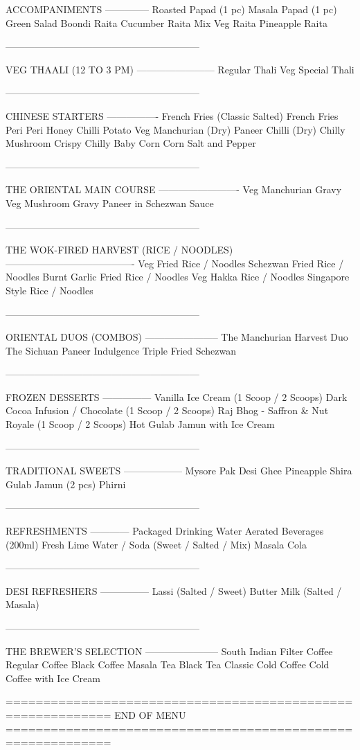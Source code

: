 ACCOMPANIMENTS
--------------
Roasted Papad (1 pc)
Masala Papad (1 pc)
Green Salad
Boondi Raita
Cucumber Raita
Mix Veg Raita
Pineapple Raita

------------------------------------------------------------

VEG THAALI (12 TO 3 PM)
------------------------
Regular Thali Veg
Special Thali

------------------------------------------------------------

CHINESE STARTERS
----------------
French Fries (Classic Salted)
French Fries Peri Peri
Honey Chilli Potato
Veg Manchurian (Dry)
Paneer Chilli (Dry)
Chilly Mushroom
Crispy Chilly Baby Corn
Corn Salt and Pepper

------------------------------------------------------------

THE ORIENTAL MAIN COURSE
-------------------------
Veg Manchurian Gravy
Veg Mushroom Gravy
Paneer in Schezwan Sauce

------------------------------------------------------------

THE WOK-FIRED HARVEST (RICE / NOODLES)
----------------------------------------
Veg Fried Rice / Noodles
Schezwan Fried Rice / Noodles
Burnt Garlic Fried Rice / Noodles
Veg Hakka Rice / Noodles
Singapore Style Rice / Noodles

------------------------------------------------------------

ORIENTAL DUOS (COMBOS)
-----------------------
The Manchurian Harvest Duo
The Sichuan Paneer Indulgence
Triple Fried Schezwan

------------------------------------------------------------

FROZEN DESSERTS
---------------
Vanilla Ice Cream (1 Scoop / 2 Scoops)
Dark Cocoa Infusion / Chocolate (1 Scoop / 2 Scoops)
Raj Bhog - Saffron & Nut Royale (1 Scoop / 2 Scoops)
Hot Gulab Jamun with Ice Cream

------------------------------------------------------------

TRADITIONAL SWEETS
------------------
Mysore Pak
Desi Ghee Pineapple Shira
Gulab Jamun (2 pcs)
Phirni

------------------------------------------------------------

REFRESHMENTS
------------
Packaged Drinking Water
Aerated Beverages (200ml)
Fresh Lime Water / Soda (Sweet / Salted / Mix)
Masala Cola

------------------------------------------------------------

DESI REFRESHERS
---------------
Lassi (Salted / Sweet)
Butter Milk (Salted / Masala)

------------------------------------------------------------

THE BREWER'S SELECTION
-----------------------
South Indian Filter Coffee
Regular Coffee
Black Coffee
Masala Tea
Black Tea
Classic Cold Coffee
Cold Coffee with Ice Cream

============================================================
END OF MENU
============================================================